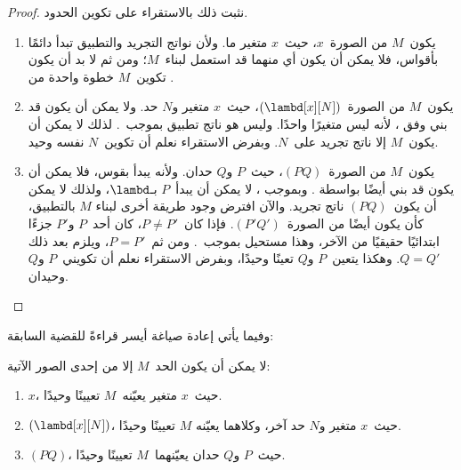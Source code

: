 \documentclass[../../../include/open-logic-section]{subfiles}
\begin{document}
\begin{proof}
  نثبت ذلك بالاستقراء على تكوين الحدود.
  \begin{enumerate}
    \item يكون~$M$ من الصورة~$x$، حيث~$x$ متغير ما. ولأن نواتج التجريد
      والتطبيق تبدأ دائمًا بأقواس، فلا يمكن أن يكون أي منهما قد استعمل
      لبناء~$M$؛ ومن ثم لا بد أن يكون تكوين~$M$ خطوة واحدة من
      .
    \item يكون~$M$ من الصورة~$(\lambd[x][N])$، حيث~$x$ متغير و$N$ حد.
      ولا يمكن أن يكون قد بني وفق
      ، لأنه ليس متغيرًا
      واحدًا. وليس هو ناتج تطبيق بموجب~. لذلك لا
      يمكن أن يكون~$M$ إلا ناتج تجريد على~$N$. وبفرض الاستقراء نعلم أن
      تكوين~$N$ نفسه وحيد.
    \item يكون~$M$ من الصورة~$(PQ)$، حيث~$P$ و$Q$ حدان. ولأنه يبدأ بقوس،
      فلا يمكن أن يكون قد بني أيضًا بواسطة
      . وبموجب
      ، لا يمكن أن يبدأ~$P$ بـ$\lambd$، ولذلك لا
      يمكن أن يكون~$(PQ)$ ناتج تجريد. والآن افترض وجود طريقة أخرى لبناء
      $M$ بالتطبيق، كأن يكون أيضًا من الصورة~$(P'Q')$. فإذا كان~$P \neq
      P'$، كان أحد~$P$ و$P'$ جزءًا ابتدائيًا حقيقيًا من الآخر، وهذا
      مستحيل بموجب~. ومن ثم~$P=P'$، ويلزم بعد ذلك
      $Q=Q'$. وهكذا يتعين~$P$ و$Q$ تعينًا وحيدًا، وبفرض الاستقراء نعلم
      أن تكويني~$P$ و$Q$ وحيدان.
  \end{enumerate}
\end{proof}

وفيما يأتي إعادة صياغة أيسر قراءةً للقضية السابقة:
\begin{prop}
  لا يمكن أن يكون الحد~$M$ إلا من إحدى الصور الآتية:
  \begin{enumerate}
    \item $x$، حيث~$x$ متغير يعيّنه~$M$ تعيينًا وحيدًا.
    \item $(\lambd[x][N])$، حيث~$x$ متغير و$N$ حد آخر، وكلاهما يعيّنه
      $M$ تعيينًا وحيدًا.
    \item $(PQ)$، حيث~$P$ و$Q$ حدان يعيّنهما~$M$ تعيينًا وحيدًا.
  \end{enumerate}
\end{prop}
\end{document}
